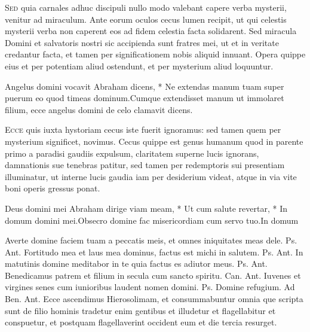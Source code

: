 \begin{multicols*}{2}
\begin{responsory}
\end{responsory}
\lettrine[lines=2]{\zallmancaps \color{Red} S}{ed} quia carnales adhuc discipuli nullo modo valebant capere verba mysterii, venitur ad miraculum. Ante eorum oculos cecus lumen recipit, ut qui celestis mysterii verba non caperent eos ad fidem celestia facta solidarent. Sed miracula Domini et salvatoris nostri sic accipienda sunt fratres mei, ut et in veritate credantur facta, et tamen per significationem nobis aliquid innuant. Opera quippe eius et per potentiam aliud ostendunt, et per mysterium aliud loquuntur.
\begin{responsory}
{Angelus domini vocavit Abraham dicens, * Ne extendas manum tuam super puerum eo quod timeas dominum.}{Cumque extendisset manum ut immolaret filium, ecce angelus domini de celo clamavit dicens.}
\end{responsory}
\lettrine[lines=2]{\zallmancaps \color{Blue} E}{cce} quis iuxta hystoriam cecus iste fuerit ignoramus: sed tamen quem per mysterium significet, novimus. Cecus quippe est genus humanum quod in parente primo a paradisi gaudiis expulsum, claritatem superne lucis ignorans, damnationis sue tenebras patitur, sed tamen per redemptoris sui presentiam illuminatur, ut interne lucis gaudia iam per desiderium videat, atque in via vite boni operis gressus ponat.
\begin{responsory-final}
{Deus domini mei Abraham dirige viam meam, * Ut cum salute revertar, * In domum domini mei.}{Obsecro domine fac misericordiam cum servo tuo.}{In domum}
\end{responsory-final}
 Averte domine faciem tuam a peccatis meis, et omnes iniquitates meas dele. {\color{Red} Ps.}  {\color{Red} Ant.} Fortitudo mea et laus mea dominus, factus est michi in salutem. {\color{Red} Ps.}  {\color{Red} Ant.} In matutinis domine meditabor in te quia factus es adiutor meus. {\color{Red} Ps.}  {\color{Red} Ant.} Benedicamus patrem et filium in secula cum sancto spiritu. {\color{Red} Can.}  {\color{Red} Ant.} Iuvenes et virgines senes cum iunioribus laudent nomen domini. {\color{Red} Ps.}  \V Domine refugium. {\color{Red} Ad Ben. Ant.} Ecce ascendimus Hierosolimam, et consummabuntur omnia que scripta sunt de filio hominis tradetur enim gentibus et illudetur et flagellabitur et conspuetur, et postquam flagellaverint occident eum et die tercia resurget.

\end{multicols*}
